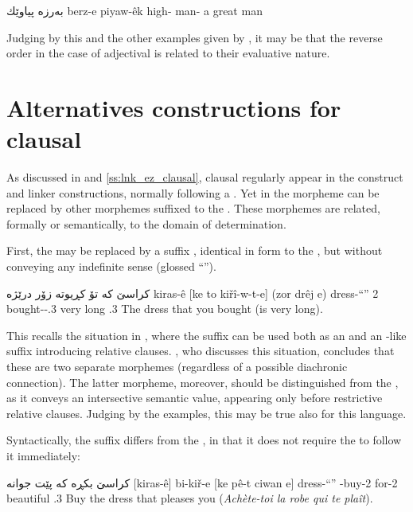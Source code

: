 {بەرزە پیاوێك}
{berz-e piyaw-êk}
{high-\ez{} man-\indef}
{a great man}
{\citep[61]{BlauSorani}}\antipar

Judging by this and the other examples given by \citet[61]{BlauSorani}, it may be that the reverse order in the case of adjectival \secns is related to their evaluative nature.


\section{Alternatives constructions for clausal \secns} \label{ss:Sor_alt_clause}

As discussed in  and \ref{ss:lnk_ez_clausal},  clausal \secns regularly appear in the construct and linker \ez* constructions, normally following a \rel*. Yet in \Sor the \ez* morpheme can be replaced by other morphemes suffixed to the \prim \citep[156]{BlauSorani}. These morphemes are related, formally or semantically, to the domain of determination.

First, the \ez* may be replaced by a suffix , identical in form to the , but without conveying any indefinite sense (glossed \enquote{\indef}). 

{كراسێ كە تۆ كڕیوتە زۆر درێژە}
{kiras-ê [ke to kiřî-w-t-e] (zor drêj \cb{}e)}
{dress-\enquote{\indef} \rel{} 2\sg{} bought-\sg-\cop.3\sg{} very long \cb{}\cop.3\sg}
{The dress that you bought (is very long).}
{\citep[156]{BlauSorani}}

This recalls the situation in \Per, where the suffix  can be used both as an  and an \ez*-like suffix introducing relative clauses.  \citet{SamvelianEnclitique}, who discusses this situation, concludes that these are two separate morphemes (regardless of a possible diachronic connection). The latter morpheme, moreover, should be distinguished from the \ez*, as it conveys an intersective semantic value, appearing only before restrictive relative clauses. Judging by the \Sor examples, this may be true also for this language.


	
Syntactically, the  suffix differs from the \ez*, in that it does not require the \secn to follow it immediately:

{كراسێ بكڕە كە پێت جوانە}
{[kiras-ê] bi-kiř-e [ke pê-t ciwan \cb{}e]}
{dress-\enquote{\indef} \subj-buy-2\sg{} \rel{} for-2\sg{} beautiful \cb{}\cop.3\sg}
{Buy the dress that pleases you (\textit{Achète-toi la robe qui te plaît}).}
{\citep[157]{BlauSorani}}

